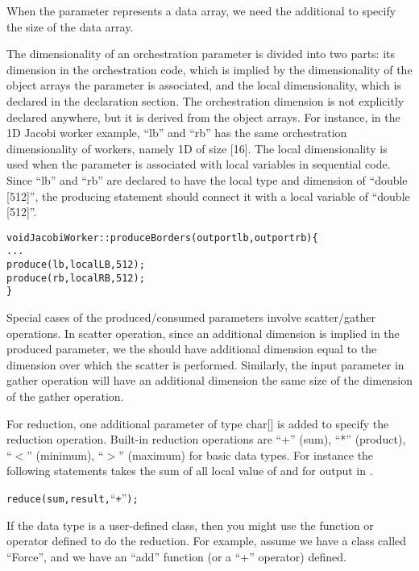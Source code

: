 When the parameter represents a data array, we need the additional
 to specify the size of the data array. 

The dimensionality of an orchestration parameter is divided into two parts: 
its dimension in the orchestration code, which is implied by the dimensionality
of the object arrays the parameter is associated, and the local dimensionality,
which is declared in the declaration section. The orchestration dimension is not
explicitly declared anywhere, but it is derived from the object arrays. For 
instance, in the 1D Jacobi worker example, ``lb'' and ``rb'' has the same 
orchestration dimensionality of workers, namely 1D of size [16]. The local
dimensionality is used when the parameter is associated with local variables 
in sequential code. Since ``lb'' and ``rb'' are declared to have the local
type and dimension of ``double [512]'', the producing statement should connect
it with a local variable of ``double [512]''.

\begin{alltt}
    void JacobiWorker::produceBorders(outport lb, outport rb)\{
      . . .
      produce(lb,localLB,512);
      produce(rb,localRB,512);
    \}
\end{alltt}

Special cases of the produced/consumed parameters involve scatter/gather
operations. In scatter operation, since an additional dimension is implied in
the produced parameter, we the  should have additional
dimension equal to the dimension over which the scatter is performed. Similarly,
the input parameter in gather operation will have an additional dimension the
same size of the dimension of the gather operation.

For reduction, one additional parameter of type char[] is added to specify the
reduction operation. Built-in reduction operations are ``+'' (sum), ``*'' (product),
``$<$'' (minimum), ``$>$'' (maximum) for basic data types. For instance the 
following statements takes the sum of all local value of  and 
for output in .

\begin{alltt}
    reduce(sum, result, ``+'');
\end{alltt}

If the data type is a user-defined class, then you might use the function or
operator defined to do the reduction. For example, assume we have a class
called ``Force'', and we have an ``add'' function (or a ``+'' operator) defined.

